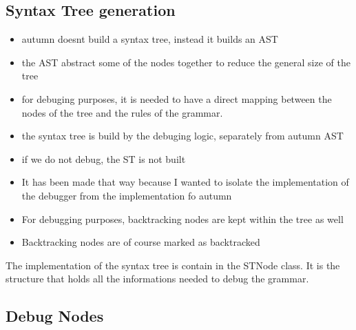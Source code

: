 %
		\subsection{Syntax Tree generation}
%
\begin{itemize}
	\item autumn doesnt build a syntax tree, instead it builds an AST
	\item the AST abstract some of the nodes together to reduce the general size of the tree
	\item for debuging purposes, it is needed to have a direct mapping between the nodes of the tree and the rules of the grammar.
	\item the syntax tree is build by the debuging logic, separately from autumn AST
	\item if we do not debug, the ST is not built
	\item It has been made that way because I wanted to isolate the implementation of the debugger from the implementation fo autumn
	\item For debugging purposes, backtracking nodes are kept within the tree as well
	\item Backtracking nodes are of course marked as backtracked
\end{itemize}

The implementation of the syntax tree is contain in the STNode class. It is the structure that holds all the informations needed to debug the grammar.


%
		\subsection{Debug Nodes}
%

